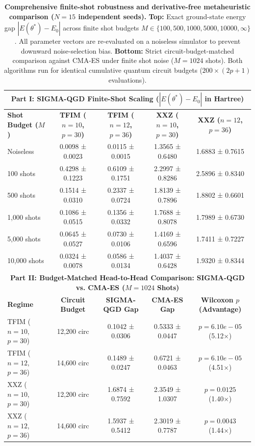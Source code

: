 \begin{table}[t]
\centering
\small
\caption{\textbf{Comprehensive finite-shot robustness and derivative-free metaheuristic comparison ($N=15$ independent seeds).} 
\textbf{Top:} Exact ground-state energy gap $|E(\theta^*) - E_0|$ across finite shot budgets $M \in \{100, 500, 1000, 5000, 10000, \infty\}$. All parameter vectors are re-evaluated on a noiseless simulator to prevent downward noise-selection bias. 
\textbf{Bottom:} Strict circuit-budget-matched comparison against CMA-ES under finite shot noise ($M=1024$ shots). Both algorithms run for identical cumulative quantum circuit budgets ($200 \times (2p+1)$ evaluations).}
\label{tab:shot_noise_cma_consolidated}
\begin{tabular}{lcccc}
\toprule
\multicolumn{5}{c}{\textbf{Part I: SIGMA-QGD Finite-Shot Scaling ($|E(\theta^*) - E_0|$ in Hartree)}} \\
\midrule
\textbf{Shot Budget ($M$)} & \textbf{TFIM ($n=10$, $p=30$)} & \textbf{TFIM ($n=12$, $p=36$)} & \textbf{XXZ ($n=10$, $p=30$)} & \textbf{XXZ ($n=12$, $p=36$)} \\
\midrule
Noiseless & 0.0098 ± 0.0023 & 0.0115 ± 0.0015 & 1.3565 ± 0.6480 & 1.6883 ± 0.7615 \\
100 shots & 0.4298 ± 0.1223 & 0.6109 ± 0.1751 & 2.2997 ± 0.8286 & 2.5896 ± 0.8340 \\
500 shots & 0.1514 ± 0.0310 & 0.2337 ± 0.0724 & 1.8139 ± 0.7896 & 1.8802 ± 0.6601 \\
1,000 shots & 0.1086 ± 0.0515 & 0.1356 ± 0.0332 & 1.7688 ± 0.8078 & 1.7989 ± 0.6730 \\
5,000 shots & 0.0645 ± 0.0527 & 0.0730 ± 0.0106 & 1.4169 ± 0.6596 & 1.7411 ± 0.7227 \\
10,000 shots & 0.0324 ± 0.0078 & 0.0586 ± 0.0134 & 1.4037 ± 0.6428 & 1.9320 ± 0.8344 \\
\midrule
\multicolumn{5}{c}{\textbf{Part II: Budget-Matched Head-to-Head Comparison: SIGMA-QGD vs. CMA-ES ($M=1024$ Shots)}} \\
\midrule
\textbf{Regime} & \textbf{Circuit Budget} & \textbf{SIGMA-QGD Gap} & \textbf{CMA-ES Gap} & \textbf{Wilcoxon $p$ (Advantage)} \\
\midrule
TFIM ($n=10$, $p=30$) & 12,200 circ & 0.1042 ± 0.0306 & 0.5333 ± 0.0447 & $p=6.10e-05$ (5.12×) \\
TFIM ($n=12$, $p=36$) & 14,600 circ & 0.1489 ± 0.0247 & 0.6721 ± 0.0463 & $p=6.10e-05$ (4.51×) \\
XXZ ($n=10$, $p=30$) & 12,200 circ & 1.6874 ± 0.7592 & 2.3549 ± 1.0307 & $p=0.0125$ (1.40×) \\
XXZ ($n=12$, $p=36$) & 14,600 circ & 1.5937 ± 0.5412 & 2.3019 ± 0.7787 & $p=0.0043$ (1.44×) \\
\bottomrule
\end{tabular}
\end{table}
